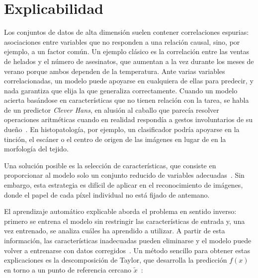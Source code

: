 %

\chapter{Explicabilidad}\label{cap:explicabilidad}

Los conjuntos de datos de alta dimensión suelen contener correlaciones espurias:
asociaciones entre variables que no responden a una relación causal, sino, por
ejemplo, a un factor común. Un ejemplo clásico es la correlación entre las ventas
de helados y el número de asesinatos, que aumentan a la vez durante los meses de
verano porque ambos dependen de la temperatura. Ante varias variables
correlacionadas, un modelo puede apoyarse en cualquiera de ellas para predecir,
y nada garantiza que elija la que generaliza correctamente. Cuando un modelo
acierta basándose en características que no tienen relación con la tarea, se
habla de un predictor \emph{Clever Hans}, en alusión al caballo que parecía
resolver operaciones aritméticas cuando en realidad respondía a gestos
involuntarios de su dueño~\cite{lapuschkin2019}. En histopatología, por ejemplo,
un clasificador podría apoyarse en la tinción, el escáner o el centro de origen
de las imágenes en lugar de en la morfología del tejido.

Una solución posible es la selección de características, que consiste en
proporcionar al modelo solo un conjunto reducido de variables
adecuadas~\cite{guyon2003}. Sin embargo, esta estrategia es difícil de aplicar en
el reconocimiento de imágenes, donde el papel de cada píxel individual no está
fijado de antemano.

El aprendizaje automático explicable aborda el problema en sentido inverso:
primero se entrena el modelo sin restringir las características de entrada y,
una vez entrenado, se analiza cuáles ha aprendido a utilizar. A partir de esta
información, las características inadecuadas pueden eliminarse y el modelo puede
volver a entrenarse con datos corregidos~\cite{montavon2019lrp}. Un método
sencillo para obtener estas explicaciones es la descomposición de Taylor, que
desarrolla la predicción $f(x)$ en torno a un punto de referencia cercano
$\tilde{x}$~\cite{montavon2019lrp}:

